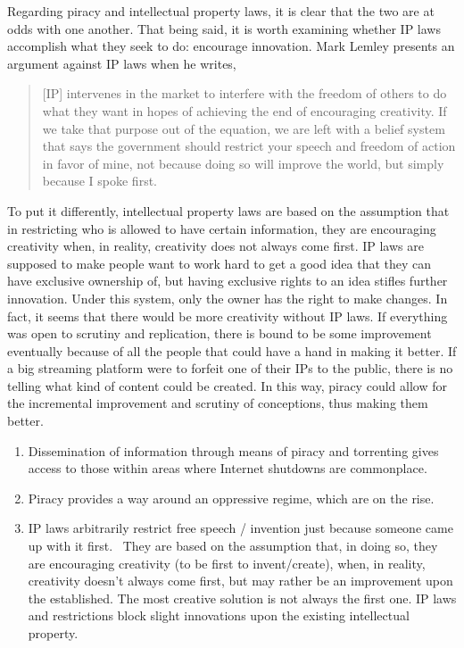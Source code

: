\documentclass[onecolumn, 12pt]{article}
\begin{document}
Regarding piracy and intellectual property laws, it is clear that the two are at odds with
one another. That being said, it is worth examining whether IP laws accomplish what they
seek to do: encourage innovation. Mark Lemley presents an argument against IP laws when he
writes, \blockcquote[1339]{lemley:faith-based}{[IP] intervenes in the market to interfere
with the freedom of others to do what they want in hopes of achieving the end of
encouraging creativity. If we take that purpose out of the equation, we are left with a
belief system that says the government should restrict your speech and freedom of action
in favor of mine, not because doing so will improve the world, but simply because I spoke
first.} 
To put it differently, intellectual property laws are based on the assumption that in
restricting who is allowed to have certain information, they are encouraging creativity
when, in reality, creativity does not always come first. IP laws are supposed to make
people want to work hard to get a good idea that they can have exclusive ownership of, but
having exclusive rights to an idea stifles further innovation. Under this system, only the
owner has the right to make changes. In fact, it seems that there would be more creativity
without IP laws. If everything was open to scrutiny and replication, there is bound to be
some improvement eventually because of all the people that could have a hand in making it
better. If a big streaming platform were to forfeit one of their IPs to the public, there
is no telling what kind of content could be created. In this way, piracy could allow for
the incremental improvement and scrutiny of conceptions, thus making them better.

\begin{enumerate}
  \item Dissemination of information through means of piracy and torrenting
    gives access to those within areas where Internet shutdowns are commonplace.

  \item Piracy provides a way around an oppressive regime, which are on the
    rise.~\cite{current:jigsaw}

  \item IP laws arbitrarily restrict free speech / invention just because
    someone came up with it first.~\cite[1339]{lemley:faith-based} They are
    based on the assumption that, in doing so, they are encouraging creativity
    (to be first to invent/create), when, in reality, creativity doesn't always
    come first, but may rather be an improvement upon the established. The most
    creative solution is not always the first one. IP laws and restrictions
    block slight innovations upon the existing intellectual property.
\end{enumerate}
\end{document}

